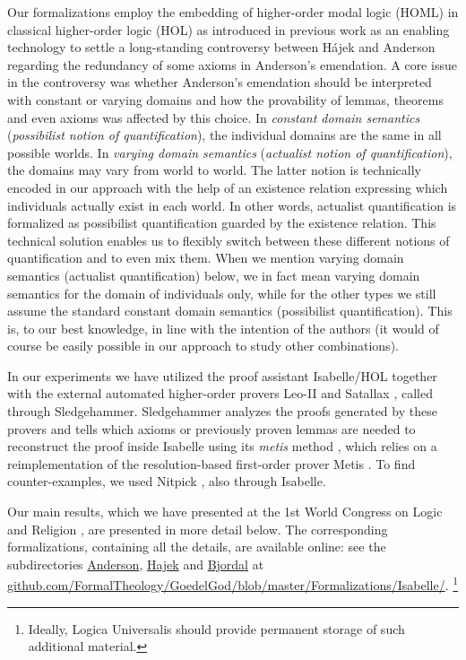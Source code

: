 \documentclass{birkjour}
\theoremstyle{definition}
\theoremstyle{remark}
\numberwithin{equation}{section}
\begin{document}
Our formalizations employ the embedding of higher-order modal logic
(HOML) in classical higher-order logic (HOL) as introduced in previous
work \citep{C40,J23} as an enabling technology to settle a long-standing
controversy between Hájek
and Anderson regarding the redundancy of some axioms in Anderson's
emendation. A core issue in the controversy was whether Anderson's emendation
should be interpreted with constant or varying domains and how the provability
of lemmas, theorems and even axioms was affected by this choice.
In \emph{constant domain semantics} (\emph{possibilist
  notion of quantification}), the individual domains are the same in
all possible worlds. In \emph{varying domain semantics}
(\emph{actualist notion of quantification}), the domains may vary from
world to world. The latter notion is technically encoded in our
approach with the help of an existence relation expressing which
individuals actually exist in each world. In other words, actualist
quantification is formalized as possibilist quantification guarded by
the existence relation. This technical solution
enables us to flexibly switch between these different notions of
quantification and to even mix them. When we mention varying
domain semantics (actualist quantification) below, we in fact mean
varying domain semantics for the domain of individuals only, while for
the other types we still assume the standard constant domain semantics
(possibilist quantification).  This is, to our best knowledge, in line 
with the intention of the authors (it would of course be easily
possible in our approach to study other combinations).  

In our
experiments we have utilized the proof assistant Isabelle/HOL
\citep{Isabelle} together with the external automated higher-order provers
Leo-II \citep{Leo-II} and Satallax \citep{Satallax}, called through Sledgehammer. Sledgehammer analyzes the proofs generated by these provers and tells which axioms or previously proven lemmas are needed to reconstruct the proof inside Isabelle using its \emph{metis} method \citep{PaulsonSusanto}, which relies on a reimplementation of the resolution-based first-order prover Metis
\citep{Hurd03first-orderproof}. To find counter-examples, we used Nitpick \citep{Nitpick}, also through Isabelle.

Our main results, which we have
presented at the 1st World Congress on Logic and Religion \citep{C41},
are presented in more detail below. The corresponding formalizations,
containing all the details, are available online: see the
subdirectories \url{Anderson}, \url{Hajek} and \url{Bjordal} at
\url{github.com/FormalTheology/GoedelGod/blob/master/Formalizations/Isabelle/}.
\footnote{Ideally, Logica Universalis should provide
  permanent storage of such additional material.}
\end{document}
